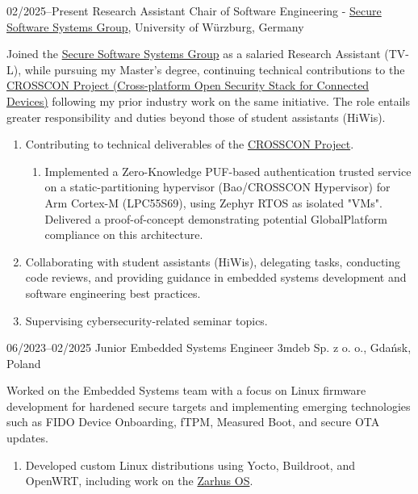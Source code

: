 \documentclass[9pt]{./src/packages/Developer_CV/developercv}
\begin{document}
\begin{entrylist}
    \raggedright %
    \entry
    {02/2025--Present}
    {Research Assistant}
    {Chair of Software Engineering - \href{https://se.informatik.uni-wuerzburg.de/en/secure-software-systems-group/}{Secure Software Systems Group}, University of Würzburg, Germany}
    {
        Joined the \href{https://se.informatik.uni-wuerzburg.de/en/secure-software-systems-group/}{Secure Software Systems Group} as a salaried Research Assistant (TV-L), while pursuing my Master’s degree, continuing technical contributions to the \href{https://crosscon.eu/}{CROSSCON Project (Cross-platform Open Security Stack for Connected Devices)} following my prior industry work on the same initiative. The role entails greater responsibility and duties beyond those of student assistants (HiWis).
    \begin{enumerate}
        \item[$\blacksquare$] Contributing to technical deliverables of the \href{https://crosscon.eu/}{CROSSCON Project}.
    \begin{enumerate}
        \item[$\blacksquare$] Implemented a Zero-Knowledge PUF-based authentication trusted service on a static-partitioning hypervisor (Bao/CROSSCON Hypervisor) for Arm Cortex-M (LPC55S69), using Zephyr RTOS as isolated "VMs". Delivered a proof-of-concept demonstrating potential GlobalPlatform compliance on this architecture.
    \end{enumerate}
        \item[$\blacksquare$] Collaborating with student assistants (HiWis), delegating tasks, conducting code reviews, and providing guidance in embedded systems development and software engineering best practices.
        \item[$\blacksquare$] Supervising cybersecurity-related seminar topics.
    \end{enumerate}
    }
    \entry
    {06/2023--02/2025}
    {Junior Embedded Systems Engineer}
    {3mdeb Sp. z o. o., Gdańsk, Poland}
    {
    Worked on the Embedded Systems team with a focus on Linux firmware development for hardened secure targets and implementing emerging technologies such as FIDO Device Onboarding, fTPM, Measured Boot, and secure OTA updates.
    \begin{enumerate}
        \item[$\blacksquare$] Developed custom Linux distributions using Yocto, Buildroot, and OpenWRT, including work on the \href{https://docs.zarhus.com/}{Zarhus OS}.

\end{enumerate}}
\end{entrylist}
\end{document}
